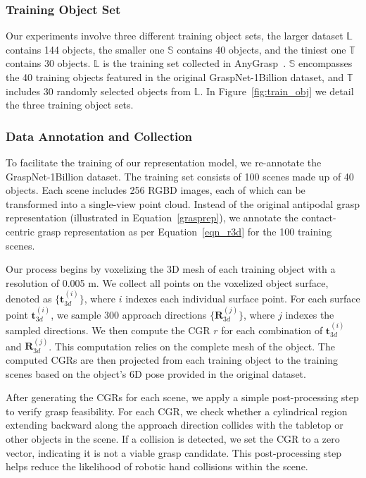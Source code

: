 \subsubsection*{Training Object Set}
Our experiments involve three different training object sets, the larger dataset $\mathbb{L}$ contains 144 objects, the smaller one $\mathbb{S}$ contains 40 objects, and the tiniest one $\mathbb{T}$ contains 30 objects. $\mathbb{L}$ is the training set collected in AnyGrasp~\cite{fang2023anygrasp}. $\mathbb{S}$ encompasses the 40 training objects featured in the original GraspNet-1Billion dataset, and $\mathbb{T}$ includes 30 randomly selected objects from $\mathbb{L}$. In Figure~\ref{fig:train_obj} we detail the three training object sets.

\subsubsection*{Data Annotation and Collection}


To facilitate the training of our representation model, we re-annotate the GraspNet-1Billion dataset. The training set consists of 100 scenes made up of 40 objects. Each scene includes 256 RGBD images, each of which can be transformed into a single-view point cloud. Instead of the original antipodal grasp representation (illustrated in Equation~\eqref{grasprep}), we annotate the contact-centric grasp representation as per Equation~\eqref{eqn_r3d} for the 100 training scenes.

Our process begins by voxelizing the 3D mesh of each training object with a resolution of 0.005 m. We collect all points on the voxelized object surface, denoted as \(\{\mathbf{t}_{3d}^{(i)}\}\), where \(i\) indexes each individual surface point. For each surface point \(\mathbf{t}_{3d}^{(i)}\), we sample 300 approach directions \(\{\mathbf{R}_{3d}^{(j)}\}\), where \(j\) indexes the sampled directions. We then compute the CGR \(r\) for each combination of \(\mathbf{t}_{3d}^{(i)}\) and \(\mathbf{R}_{3d}^{(j)}\). This computation relies on the complete mesh of the object. The computed CGRs are then projected from each training object to the training scenes based on the object’s 6D pose provided in the original dataset.

After generating the CGRs for each scene, we apply a simple post-processing step to verify grasp feasibility. For each CGR, we check whether a cylindrical region extending backward along the approach direction collides with the tabletop or other objects in the scene. If a collision is detected, we set the CGR to a zero vector, indicating it is not a viable grasp candidate. This post-processing step helps reduce the likelihood of robotic hand collisions within the scene.

